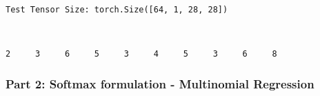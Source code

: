 \documentclass[11pt]{article}
\begin{document}
    \begin{Verbatim}[commandchars=\\\{\}]
Test Tensor Size: torch.Size([64, 1, 28, 28])

    \end{Verbatim}

    \begin{center}
    \end{center}
    { \hspace*{\fill} \\}
    
    \begin{Verbatim}[commandchars=\\\{\}]
    2     3     6     5     3     4     5     3     6     8

    \end{Verbatim}

    \subsubsection{Part 2: Softmax formulation - Multinomial
Regression}\label{part-2-softmax-formulation---multinomial-regression}
\end{document}
